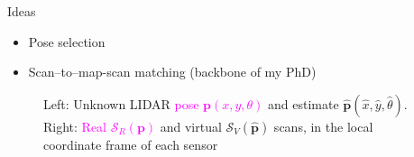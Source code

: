 \begin{frame}{Ideas}

  \vspace{3em}
  \begin{itemize}
    \item Pose selection
    \item Scan--to--map-scan matching (backbone of my PhD)
  \end{itemize}

  \vspace{-3em}
  \begin{figure}\centering
    \resizebox{6cm}{!}{}
    \vspace{-3em}
    \caption{Left: Unknown LIDAR \textcolor{magenta}{pose $\bm{p}(x,y,\theta)$} and
\textcolor[RGB]{0,71,145}{estimate $\hat{\bm{p}}(\hat{x},\hat{y},\hat{\theta})$}. Right: \textcolor{magenta}{Real $\mathcal{S}_R(\bm{p})$} and
\textcolor[RGB]{0,71,145}{virtual $\mathcal{S}_V(\hat{\bm{p}})$}
scans, in the local coordinate frame of each sensor}
  \end{figure}



\end{frame}
